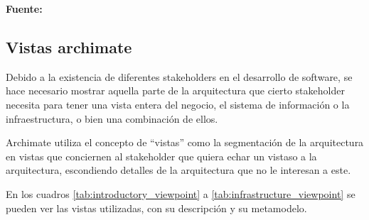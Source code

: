 \begin{itemize}
\begin{table}
\begin{center}
  \textbf{Fuente:} \cite{archimate2}
    \end{center}
\end{table}

\end{itemize}

\subsection{Vistas archimate}

Debido a la existencia de diferentes stakeholders en el desarrollo de software, se hace necesario mostrar aquella parte de la arquitectura que cierto stakeholder necesita para tener una vista entera del negocio, el sistema de información o la infraestructura, o bien una combinación de ellos.

Archimate utiliza el concepto de “vistas” como la segmentación de la arquitectura en vistas que conciernen al stakeholder que quiera echar un vistaso a la arquitectura, escondiendo detalles de la arquitectura que no le interesan a este.

En los cuadros \ref{tab:introductory_viewpoint} a \ref{tab:infrastructure_viewpoint} se pueden ver las vistas utilizadas, con su descripción y su metamodelo.

